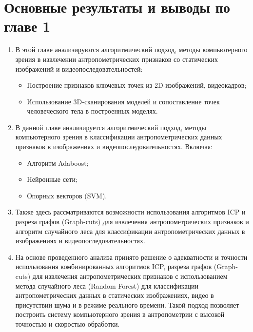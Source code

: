 \section{Основные результаты и выводы по главе 1}

\begin{enumerate}
	\item В этой главе анализируются алгоритмический подход, методы компьютерного зрения в извлечении антропометрических признаков со статических изображений и видеопоследовательностей:
	
	\begin{itemize}
		\item Построение признаков ключевых точек из 2D-изображений, видеокадров;
		\item Использование 3D-сканирования моделей и сопоставление точек человеческого тела в построенных моделях.
	\end{itemize}
	
	\item В данной главе анализируется алгоритмический подход, методы компьютерного зрения в классификации антропометрических данных признаков в изображениях и видеопоследовательностях. Включая:
	
	\begin{itemize}
		\item Алгоритм Adaboost;
		\item Нейронные сети;
		\item Опорных векторов (SVM).
	\end{itemize}
\item Также здесь рассматриваются возможности использования алгоритмов ICP и разреза графов (Graph-сuts) для извлечения антропометрических признаков и алгоритм случайного леса для классификации антропометрических данных в изображениях и видеопоследовательностях.
\item На основе проведенного анализа принято решение о адекватности и точности использования комбинированных алгоритмов ICP, разреза графов (Graph-cuts) для извлечения антропометрических признаков с использованием метода случайного леса (Random Forest) для классификации антропометрических данных в статических изображениях, видео в присутствии шума и в режиме реального времени. Такой подход позволяет построить систему компьютерного зрения в антропометрии с высокой точностью и скоростью обработки.
\end{enumerate}

